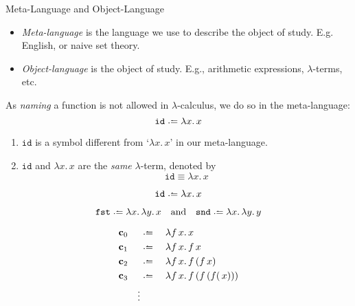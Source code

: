 \begin{frame}{Meta-Language and Object-Language}
  \begin{itemize}
    \item \emph{Meta-language} is the language we use to describe the object of
      study. E.g. English, or naive set theory. 
    \item \emph{Object-language} is the object of study. E.g., arithmetic
      expressions, $\lambda$-terms, etc.
  \end{itemize}
  As \emph{naming} a function is not allowed in $\lambda$-calculus, we do so
  in the meta-language:
    \[
      \mathtt{id} \defeq \lambda x.\, x
    \]
  \begin{enumerate}
    \item $\mathtt{id}$ is a symbol different from `$\lambda x.\,x$' in our meta-language.
    \item $\mathtt{id}$ and $\lambda x.\, x$ are the \emph{same} $\lambda$-term, denoted by
      \[
        \mathtt{id} \equiv \lambda x.\, x
      \]
  \end{enumerate}
\end{frame}

\begin{frame}
  \begin{example}
    \[
      \mathtt{id} \defeq \lambda x.\, x
    \]
  \end{example}

  \begin{example}[Projections]
    \[
      \mathtt{fst} \defeq \lambda x.\, \lambda y.\, x
      \quad\text{and}\quad \mathtt{snd} \defeq \lambda x.\, \lambda y.\, y
    \]
  \end{example}
  \begin{example}
    \begin{align*}
      &\bc_{0}   &&\defeq \;&& \lambda f\,x.\, x \\
      &\bc_{1} &&\defeq \;&& \lambda f\,x.\, f\,x \\
      &\bc_{2} &&\defeq \;&& \lambda f\,x.\, f\,(f\,x) \\
      &\bc_{3} &&\defeq \;&& \lambda f\,x.\, f\,(f\,(f(\,x))) \\
      && \vdots 
    \end{align*}
  \end{example}
\end{frame}

